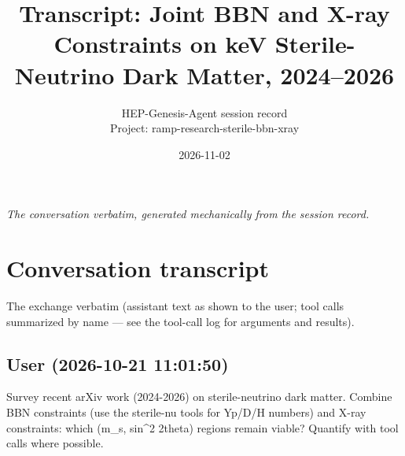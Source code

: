 \documentclass[11pt,a4paper]{article}
\title{Transcript: Joint BBN and X-ray Constraints on keV Sterile-Neutrino Dark Matter, 2024--2026}
\author{HEP-Genesis-Agent session record \\ \small Project: ramp-research-sterile-bbn-xray}
\date{2026-11-02}
\begin{document}
\maketitle
\noindent\textit{\small The conversation verbatim, generated mechanically from the session record.}
\vspace{1em}



\appendix
\section{Conversation transcript}
\label{app:transcript}
The exchange verbatim (assistant text as shown to the user; tool calls summarized by name --- see the tool-call log for arguments and results).
\subsection*{User \small(2026-10-21 11:01:50)}
Survey recent arXiv work (2024-2026) on sterile-neutrino dark matter. Combine BBN constraints (use the sterile-nu tools for Yp/D/H numbers) and X-ray constraints: which (m\_s, sin\textasciicircum{}2 2theta) regions remain viable? Quantify with tool calls where possible.
\end{document}
